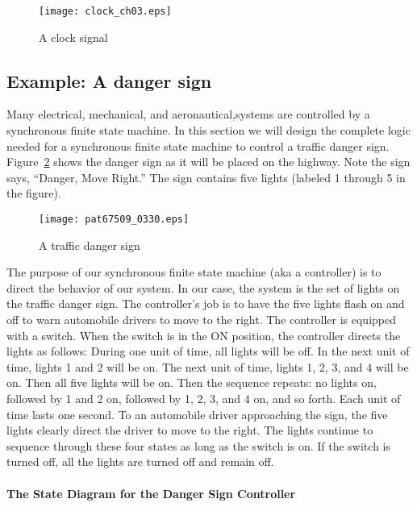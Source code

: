 \documentclass{patt}
\begin{document}
\begin{figure}
\begin{minipage}{36pc}
\centerline{\texttt{[image: clock\_ch03.eps]}}
\caption{A clock signal}\label{fig:clock_ch03}
\end{minipage}
\end{figure}

\FloatBarrier
\subsection{Example: A danger sign}

Many electrical, mechanical, and aeronautical,systems are controlled by a 
synchronous finite state machine.  In this section we will design the 
complete logic needed for a synchronous finite state machine to control a 
traffic danger sign.  Figure~\ref{fig:dangersign} shows the danger sign as 
it will be placed on the highway.  Note the sign says, ``Danger, Move Right.''
The sign contains five lights (labeled 1 through 5 in the figure).

\begin{figure}
\centerline{\texttt{[image: pat67509\_0330.eps]}}
\caption{A traffic danger sign}\label{fig:dangersign}
\vspace{-6pt}
\end{figure}

The purpose of our synchronous finite state machine (aka a controller) is
to direct the behavior of our system.  In our case, the system is the
set of lights on the traffic danger sign.  The controller's job is to
have the five lights flash on and off to warn automobile drivers to move
to the right.  The controller is equipped with a switch.  When the switch is
in the ON position,
the controller directs the lights as follows: During one unit of time,
all lights will be off.  In the next unit of time, lights 1 and 2 will be on.
The next unit of time, lights 1, 2, 3, and 4 will be on.  Then all
five lights will be on.  Then the sequence repeats: no
lights on, followed by 1 and 2 on, followed by 1, 2, 3, and 4 on, and
so forth.  Each unit of time lasts one second.  To an automobile driver
approaching the sign, the five lights clearly direct the driver to move to the
right.  The lights continue to sequence through these four states as long as 
the switch is on.  If the switch is turned off, all the lights are turned off 
and remain off.

\FloatBarrier

\paragraph{The State Diagram for the Danger Sign Controller}
\end{document}
